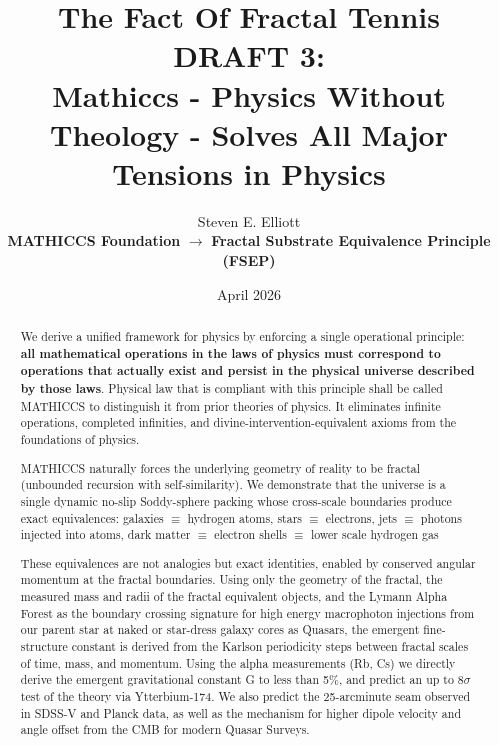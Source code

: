 \documentclass[11pt,a4paper]{article}
\title{The Fact Of Fractal Tennis DRAFT 3: \\ Mathiccs - Physics Without Theology - Solves All Major Tensions in Physics }
\author{Steven E. Elliott \\ \textbf{MATHICCS Foundation} $\to$ \textbf{Fractal Substrate Equivalence Principle (FSEP)}}
\date{April 2026}
\begin{document}
\maketitle




\begin{abstract}
We derive a unified framework for physics by enforcing a single operational principle: \textbf{all mathematical operations in the laws of physics must correspond to operations that actually exist and persist in the physical universe described by those laws}. Physical law that is compliant with this principle shall be called MATHICCS to distinguish it from prior theories of physics. It eliminates infinite operations, completed infinities, and divine-intervention-equivalent axioms from the foundations of physics. 

MATHICCS naturally forces the underlying geometry of reality to be fractal (unbounded recursion with self-similarity). We demonstrate that the universe is a single dynamic no-slip Soddy-sphere packing whose cross-scale boundaries produce exact equivalences: galaxies $\equiv$ hydrogen atoms, stars $\equiv$ electrons, jets $\equiv$ photons injected into atoms, dark matter $\equiv$ electron shells $\equiv$ lower scale hydrogen gas

These equivalences are not analogies but exact identities, enabled by conserved angular momentum at the fractal boundaries. Using only the geometry of the fractal, the measured mass and radii of the fractal equivalent objects, and the Lymann Alpha Forest as the boundary crossing signature for high energy macrophoton injections from our parent star at naked or star-dress galaxy cores as Quasars, the emergent fine-structure constant is derived from the Karlson periodicity steps between fractal scales of time, mass, and momentum. Using the alpha measurements (Rb, Cs) we directly derive the emergent gravitational constant G to less than 5\%, and predict an up to 8$\sigma$ test of the theory via Ytterbium-174. We also predict the 25-arcminute seam observed in SDSS-V and Planck data, as well as the mechanism for higher dipole velocity and angle offset from the CMB for modern Quasar Surveys.



\end{abstract}
\end{document}
